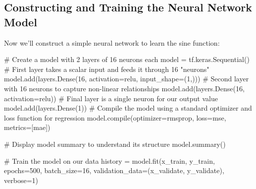 \documentclass[
  9pt,
  letterpaper,
  abstract,
  titlepage]{scrbook}
\newenvironment{Shaded}{\begin{snugshade}}{\end{snugshade}}
\newcommand{\BuiltInTok}[1]{\textcolor[rgb]{0.00,0.23,0.31}{#1}}
\newcommand{\CommentTok}[1]{\textcolor[rgb]{0.37,0.37,0.37}{#1}}
\newcommand{\DecValTok}[1]{\textcolor[rgb]{0.68,0.00,0.00}{#1}}
\newcommand{\NormalTok}[1]{\textcolor[rgb]{0.00,0.23,0.31}{#1}}
\newcommand{\OperatorTok}[1]{\textcolor[rgb]{0.37,0.37,0.37}{#1}}
\newcommand{\StringTok}[1]{\textcolor[rgb]{0.13,0.47,0.30}{#1}}
\begin{document}
\subsection{Constructing and Training the Neural Network
Model}\label{constructing-and-training-the-neural-network-model}

Now we'll construct a simple neural network to learn the sine function:

\begin{Shaded}
\begin{Highlighting}[]
\CommentTok{\# Create a model with 2 layers of 16 neurons each}
\NormalTok{model }\OperatorTok{=}\NormalTok{ tf.keras.Sequential()}
\CommentTok{\# First layer takes a scalar input and feeds it through 16 "neurons"}
\NormalTok{model.add(layers.Dense(}\DecValTok{16}\NormalTok{, activation}\OperatorTok{=}\StringTok{\textquotesingle{}relu\textquotesingle{}}\NormalTok{, input\_shape}\OperatorTok{=}\NormalTok{(}\DecValTok{1}\NormalTok{,)))}
\CommentTok{\# Second layer with 16 neurons to capture non{-}linear relationships}
\NormalTok{model.add(layers.Dense(}\DecValTok{16}\NormalTok{, activation}\OperatorTok{=}\StringTok{\textquotesingle{}relu\textquotesingle{}}\NormalTok{))}
\CommentTok{\# Final layer is a single neuron for our output value}
\NormalTok{model.add(layers.Dense(}\DecValTok{1}\NormalTok{))}
\CommentTok{\# Compile the model using a standard optimizer and loss function for regression}
\NormalTok{model.}\BuiltInTok{compile}\NormalTok{(optimizer}\OperatorTok{=}\StringTok{\textquotesingle{}rmsprop\textquotesingle{}}\NormalTok{, loss}\OperatorTok{=}\StringTok{\textquotesingle{}mse\textquotesingle{}}\NormalTok{, metrics}\OperatorTok{=}\NormalTok{[}\StringTok{\textquotesingle{}mae\textquotesingle{}}\NormalTok{])}

\CommentTok{\# Display model summary to understand its structure}
\NormalTok{model.summary()}

\CommentTok{\# Train the model on our data}
\NormalTok{history }\OperatorTok{=}\NormalTok{ model.fit(x\_train, y\_train, }
\NormalTok{                    epochs}\OperatorTok{=}\DecValTok{500}\NormalTok{, }
\NormalTok{                    batch\_size}\OperatorTok{=}\DecValTok{16}\NormalTok{,}
\NormalTok{                    validation\_data}\OperatorTok{=}\NormalTok{(x\_validate, y\_validate),}
\NormalTok{                    verbose}\OperatorTok{=}\DecValTok{1}\NormalTok{)}


\end{Highlighting}
\end{Shaded}
\end{document}
